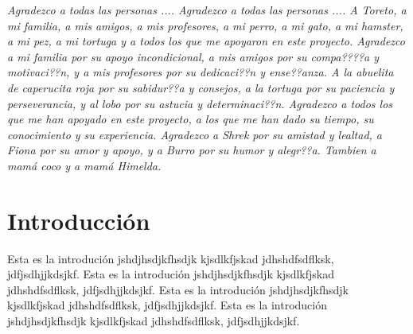 \documentclass[12pt,letterpaper,spanish]{report}
\newenvironment{dedication}{\newpage\large\null\em\vskip1in}%
{\vfill}
\begin{document}
        \thispagestyle{empty}

        \begin{dedication}
           Agradezco a todas las personas .... Agradezco a todas las personas ....
           A Toreto, a mi familia, a mis amigos, a mis profesores, a mi perro, a mi gato, a mi hamster, a mi pez, a mi tortuga y a todos los que me apoyaron en este proyecto.
           Agradezco a mi familia por su apoyo incondicional, a mis amigos por su compa????a y motivaci??n, y a mis profesores por su dedicaci??n y ense??anza.
           A la abuelita de caperucita roja por su sabidur??a y consejos, a la tortuga por su paciencia y perseverancia, y al lobo por su astucia y determinaci??n.
           Agradezco a todos los que me han apoyado en este proyecto, a los que me han dado su tiempo, su conocimiento y su experiencia.
           Agradezco a Shrek por su amistad y lealtad, a Fiona por su amor y apoyo, y a Burro por su humor y alegr??a.
           Tambien a mamá coco y a mamá Himelda.
        \end{dedication}




\tableofcontents



\oddsidemargin 0.2in \textwidth 6.5in \topmargin -0.25in
\textheight 9in \pagestyle{myheadings}

\newpage



\chapter{Introducción}
\newpage


Esta es la introdución jshdjhsdjkfhsdjk kjsdlkfjskad jdhshdfsdflksk, jdfjsdhjjkdsjkf.
Esta es la introdución jshdjhsdjkfhsdjk kjsdlkfjskad jdhshdfsdflksk, jdfjsdhjjkdsjkf.
Esta es la introdución jshdjhsdjkfhsdjk kjsdlkfjskad jdhshdfsdflksk, jdfjsdhjjkdsjkf.
Esta es la introdución jshdjhsdjkfhsdjk kjsdlkfjskad jdhshdfsdflksk, jdfjsdhjjkdsjkf.
\\
\end{document}
